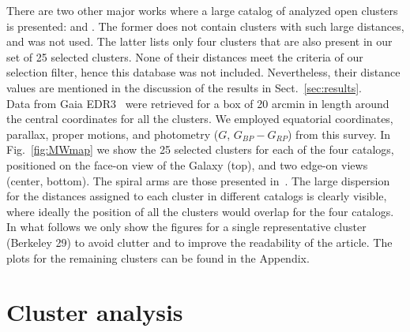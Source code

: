 \documentclass{aa}
\begin{document}
 There are two other major works where a large catalog of analyzed open clusters
 is presented: \cite{Lui_2019} and \cite{Dias_2021}. The former does not contain
 clusters with such large distances, and was not used. The latter lists
 only four clusters that are also present in our set of 25  selected
 clusters. None of their distances meet the criteria of  our selection filter, hence this
 database was not included. Nevertheless, their distance values are
 mentioned in the discussion of the results in Sect.~\ref{sec:results}.\\

 Data from Gaia EDR3~\citep{Gaia_2016,Gaia_EDR3} were retrieved for a box of 20
 arcmin in length around the central coordinates for all the clusters. We
 employed equatorial coordinates, parallax, proper motions, and photometry
 ($G$, $G_{BP}-G_{RP}$) from this survey.
 In Fig.~\ref{fig:MWmap} we show the 25 selected clusters for each of
 the four catalogs, positioned on the face-on view of the Galaxy (top), and
 two edge-on views (center, bottom). The spiral arms are those presented
 in~\cite{Momany_2006}. The large dispersion for the distances
 assigned to each cluster in different catalogs is clearly visible, where
 ideally the position of all the clusters would overlap for the four catalogs.\\

 In what follows we  only show the figures for a single representative
 cluster (Berkeley 29) to avoid  clutter and to improve the readability of the
 article. The plots for the remaining clusters can be found in the Appendix.

 \begin{figure*}
  \caption{Position of the 25 clusters selected from the four
    catalogs mentioned in the text.
    Left: face-on view of the Milky Way. The Sun and the center of the Galaxy
    are shown as  a yellow filled circle and a  black filled circle,
    respectively. Right, top and bottom: Same as left, but for edge-on views.
    The sight lines are shown in gray for each cluster.}
  \label{fig:MWmap}
 \end{figure*}





\section{Cluster analysis}
 \label{sec:clust_analy}
\end{document}
